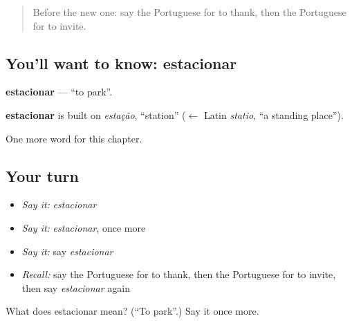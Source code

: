 \label{lesson:PT-C171-estacionar}



\begin{quote}
Before the new one: say the Portuguese for to thank, then the Portuguese for to invite.
\end{quote}

\subsection*{You'll want to know: estacionar}
\textbf{estacionar} — \textquotedblleft{}to park\textquotedblright{}.

\begin{cousinweb}
\textbf{estacionar} is built on \emph{estação}, \textquotedblleft{}station\textquotedblright{} ($\leftarrow$ Latin \emph{statio}, \textquotedblleft{}a standing place\textquotedblright{}).
\end{cousinweb}

\begin{grammarlens}[title={What you've built}]
One more word for this chapter.
\end{grammarlens}

\subsection*{Your turn}
\begin{itemize}
\raggedright
  \item \emph{Say it:} \emph{estacionar}
  \item \emph{Say it:} \emph{estacionar}, once more
  \item \emph{Say it:} say \emph{estacionar}
  \item \emph{Recall:} say the Portuguese for to thank, then the Portuguese for to invite, then say \emph{estacionar} again
\end{itemize}

\begin{tcolorbox}[breakable,colback=teal!4,colframe=teal!35!black,title={Before you move on}]
What does estacionar mean? (\textquotedblleft{}To park\textquotedblright{}.) Say it once more.
\end{tcolorbox}

